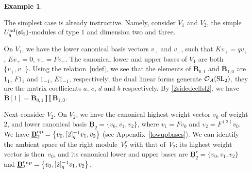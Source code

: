 \documentclass[10pt,a4paper]{amsart}
\numberwithin{equation}{section}
\theoremstyle{definition}
\newtheorem{exa}[teo]{Example}
\newcommand{\Oo}{{\mathcal O}}
\begin{document}
\begin{exa}\label{V2V20}{\rm The simplest case is already instructive. Namely, consider $V_1$ and $V_2$, the simple $U_q^{\rm ad}({\mathfrak{sl}_2})$-modules of type $1$ and dimension two and three.

On $V_1$, we have the lower canonical basis vectors $v_+$ and $v_-$, such that $Kv_+ = qv_+$, $Ev_+=0$, $v_- = Fv_+$. The canonical lower and upper bases of $V_1$ are both $\{v_+,v_-\}$. Using the relation~\eqref{udef}, we see that the elements of $\dot{\mathbf{B}}_{0,1}$ and $\dot{\mathbf{B}}_{1,0}$ are $1_1$, $F1_1$ and $1_{-1}$, $E1_{-1}$, respectively; the dual linear forms generate $\Oo_A({\rm SL}_2)$, they are the matrix coefficients $a$, $c$, $d$ and $b$ respectively. By \eqref{2sidedcellsl2}, we have $\dot{\mathbf{B}} [1] = \dot{\mathbf{B}}_{0,1}\coprod \dot{\mathbf{B}}_{1,0}$.

Next consider $V_2$. On $V_2$, we have the canonical highest weight vector $v_0$ of weight $2$, and lower canonical basis $\underline{\mathbf{B}}_{2}=\{v_0,v_1,v_2\}$, where $v_1=Fv_0$ and $v_2=F^{(2)}v_0$. We have ${\underline{\mathbf{B}}_{2}^{\rm up}=\big\{v_0,[2]_q^{-1}v_1,v_2\big\}}$ (see Appendix~\ref{lowupbases}). We can identify the ambient space of the right module~$V_2^r$ with that of~$V_2$; its highest weight vector is then~$v_0$, and its canonical lower and upper bases are $\underline{\mathbf{B}}_{2}^r=\{v_0,v_1,v_2\}$ and $\underline{\mathbf{B}}_{2}^r{}^{\rm up}=\big\{v_0,[2]_q^{-1}v_1,v_2\big\}$.

}
\end{exa}
\end{document}
